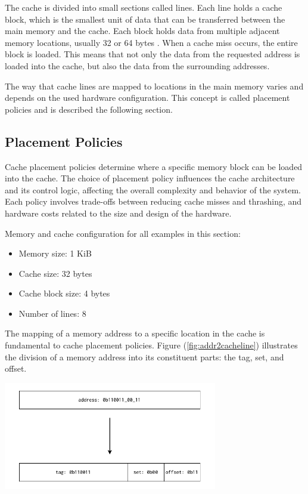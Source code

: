 \noindent The cache is divided into small sections called lines. Each line holds a cache block, which is the smallest unit of data that can be transferred between the main memory
and the cache. Each block holds data from multiple adjacent memory locations, usually 32 or 64 bytes \cite{comparchaquant}. When a cache miss occurs, the entire block is loaded.
This means that not only the data from the requested address is loaded into the cache, but also the data from the surrounding addresses.

The way that cache lines are mapped to locations in the main memory varies and depends on the used hardware configuration. This concept is called placement policies and is
described the following section.

\subsection{Placement Policies} \label{sec:placement}
Cache placement policies determine where a specific memory block can be loaded into the cache. The choice of placement policy influences the cache architecture and its control
logic, affecting the overall complexity and behavior of the system. Each policy involves trade-offs between reducing cache misses and thrashing, and hardware costs related to the
size and design of the hardware.

\vspace{10px}
\noindent Memory and cache configuration for all examples in this section:
\begin{itemize}
	\item Memory size: 1 KiB
	\item Cache size: 32 bytes
	\item Cache block size: 4 bytes
	\item Number of lines: 8
\end{itemize}

\vspace{10px}
\noindent The mapping of a memory address to a specific location in the cache is fundamental to cache placement policies. Figure (\ref{fig:addr2cacheline}) illustrates the division
of a memory address into its constituent parts: the tag, set, and offset.

\begin{center}
	\centering
	\includegraphics[width=0.7\textwidth]{figures/02-background/caches-addr_to_cache_line_loc.pdf}
	\label{fig:addr2cacheline}
\end{center}

